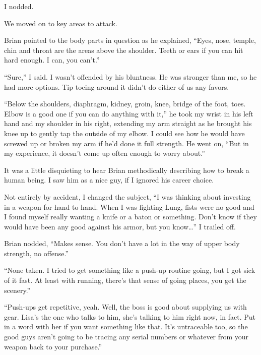 I nodded.



We moved on to key areas to attack.



Brian pointed to the body parts in question as he explained, ``Eyes, nose, temple, chin and throat are the areas above the shoulder.  Teeth or ears if you can hit hard enough.  I can, you can't.''



``Sure,'' I said.  I wasn't offended by his bluntness.  He was stronger than me, so he had more options.  Tip toeing around it didn't do either of us any favors.



``Below the shoulders, diaphragm, kidney, groin, knee, bridge of the foot, toes.  Elbow is a good one if you can do anything with it,'' he took my wrist in his left hand and my shoulder in his right, extending my arm straight as he brought his knee up to gently tap the outside of my elbow.  I could see how he would have screwed up or broken my arm if he'd done it full strength.  He went on, ``But in my experience, it doesn't come up often enough to worry about.''



It was a little disquieting to hear Brian methodically describing how to break a human being.  I saw him as a nice guy, if I ignored his career choice.



Not entirely by accident, I changed the subject, ``I was thinking about investing in a weapon for hand to hand.  When I was fighting Lung, fists were no good and I found myself really wanting a knife or a baton or something.  Don't know if they would have been any good against his armor, but you know\ldots'' I trailed off.



Brian nodded, ``Makes sense.  You don't have a lot in the way of upper body strength, no offense.''



``None taken.  I tried to get something like a push-up routine going, but I got sick of it fast.  At least with running, there's that sense of going places, you get the scenery.''



``Push-ups get repetitive, yeah.  Well, the boss is good about supplying us with gear.  Lisa's the one who talks to him, she's talking to him right now, in fact.  Put in a word with her if you want something like that.  It's untraceable too, so the good guys aren't going to be tracing any serial numbers or whatever from your weapon back to your purchase.''



